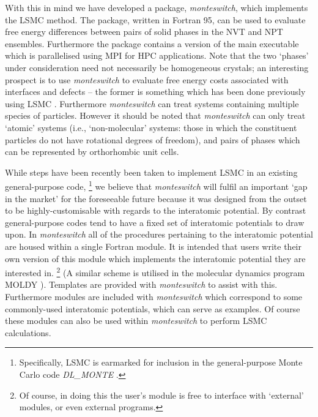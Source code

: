 \documentclass{report}
\begin{document}
With this in mind we have developed a package, \emph{monteswitch}, which implements the LSMC method. The package, written in Fortran 95, can
be used to evaluate free energy differences between pairs of solid phases in the NVT and NPT ensembles. Furthermore the
package contains a version of the main executable which is parallelised using MPI for HPC applications.
Note that the two `phases' under consideration need not necessarily be homogeneous crystals; 
an interesting prospect is to use \emph{monteswitch} to evaluate free energy costs associated with interfaces and defects -- the former is something which
has been done previously using LSMC \cite{Pronk_1999}.
Furthermore \emph{monteswitch} can treat systems containing multiple species of particles.
However it should be noted that \emph{monteswitch} can only treat `atomic' systems (i.e., `non-molecular' systems: those in which the constituent
particles do not have rotational degrees of freedom), and pairs of phases which can be represented by orthorhombic unit cells.

While steps have been recently been taken to implement LSMC in an existing general-purpose code,
\footnote{Specifically, LSMC is earmarked for inclusion in the general-purpose Monte Carlo code \emph{DL\_MONTE} \cite{Purton_2013}.}
we believe that \emph{monteswitch} will fulfil an important `gap in the market' for the foreseeable future because it was designed from 
the outset to be highly-customisable with regards to the interatomic potential. By contrast general-purpose codes tend to have a fixed set 
of interatomic potentials to draw upon.
In \emph{monteswitch} all of the procedures pertaining to the interatomic potential are housed within a single Fortran module. 
It is intended that users write their own version of this module which implements the interatomic potential they are 
interested in.
\footnote{Of course, in doing this the user's module is free to interface with `external' modules, or even external programs.}
(A similar scheme is utilised in the molecular dynamics program MOLDY \cite{Ackland_2011}). 
Templates are provided with \emph{monteswitch} to assist with this. Furthermore modules are included
with \emph{monteswitch} which correspond to some commonly-used interatomic potentials, which can serve as examples. Of course these modules can also be
used within \emph{monteswitch} to perform LSMC calculations.
\end{document}
